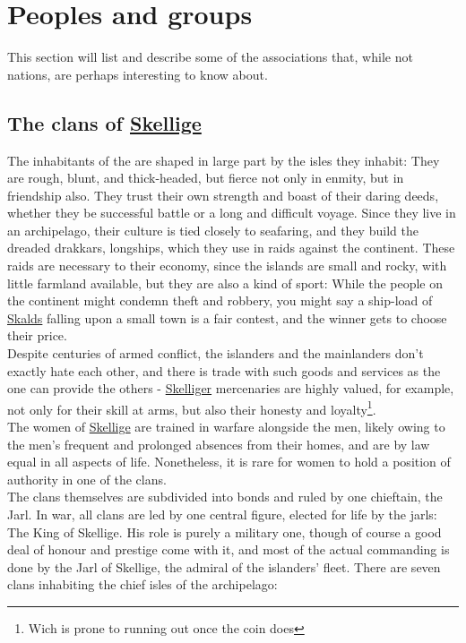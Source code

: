\documentclass[parskip=full,11pt,%
footheight=38pt]{scrreport}
\begin{document}



\section{Peoples and groups}
This section will list and describe some of the associations that, while not nations, are perhaps interesting to know about.

\subsection{The clans of \hyperref[region:skellige]{Skellige}}\label{people:skellige}
The inhabitants of the  are shaped in large part by the isles they inhabit: They are rough, blunt,
and thick-headed, but fierce not only in enmity, but in friendship also. They trust their own strength and boast of their
daring deeds, whether they be successful battle or a long and difficult voyage. Since they live in an archipelago, their culture
is tied closely to seafaring, and they build the dreaded drakkars, longships, which they use in raids against the continent.
These raids are necessary to their economy, since the islands are small and rocky, with little farmland available, but they are
also a kind of sport: While the people on the continent might condemn theft and robbery, you might say a ship-load of \hyperref[people:skellige]{Skalds}
falling upon a small town is a fair contest, and the winner gets to choose their price.
\\[1ex]
Despite centuries of armed conflict, the islanders and the mainlanders don't exactly hate each other, and there is trade with
such goods and services as the one can provide the others - \hyperref[region:skellige]{Skelliger} mercenaries are highly valued,
for example, not only for their skill at arms, but also their honesty and loyalty\footnote{Wich is prone to running out once the coin does}.
\\[1ex]
The women of \hyperref[region:skellige]{Skellige} are trained in warfare alongside the men, likely owing to the men's frequent and prolonged
absences from their homes, and are by law equal in all aspects of life. Nonetheless, it is rare for women to hold a position of authority
in one of the clans.
\\[2ex]
The clans themselves are subdivided into bonds and ruled by one chieftain, the Jarl. In war, all clans are led by one central figure,
elected for life by the jarls: The King of Skellige. His role is purely a military one, though of course a good deal of honour and prestige
come with it, and most of the actual commanding is done by the Jarl of Skellige, the admiral of the islanders' fleet. There are seven clans
inhabiting the chief isles of the archipelago:
\end{document}
